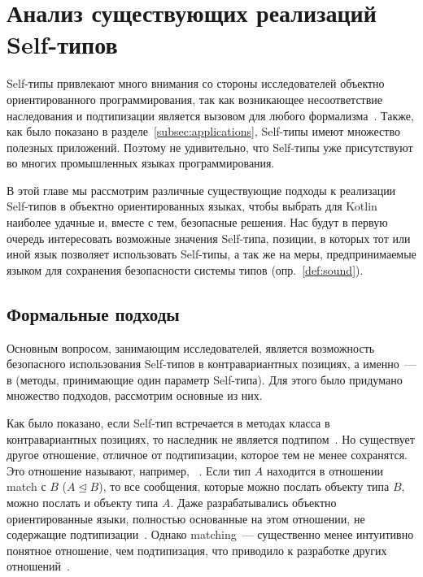 \section{Анализ существующих реализаций Self-типов} \label{sec:impls}

Self-типы привлекают много внимания со стороны исследователей объектно ориентированного программирования, так как возникающее несоответствие наследования и подтипизации является вызовом для любого формализма~\cite{cook1989inheritance}.
Также, как было показано в разделе~\ref{subsec:applications}, Self-типы имеют множество полезных приложений.
Поэтому не удивительно, что Self-типы уже присутствуют во многих промышленных языках программирования.

В этой главе мы рассмотрим различные существующие подходы к реализации Self-типов в объектно ориентированных языках, чтобы выбрать для Kotlin наиболее удачные и, вместе с тем, безопасные решения.
Нас будут в первую очередь интересовать возможные значения Self-типа, позиции, в которых тот или иной язык позволяет использовать Self-типы, а так же на меры, предпринимаемые языком для сохранения безопасности системы типов (опр.~\ref{def:sound}).


\subsection{Формальные подходы} \label{subsec:formals}

Основным вопросом, занимающим исследователей, является возможность безопасного использования Self-типов в контравариантных позициях, а именно~--- в  (методы, принимающие один параметр Self-типа).
Для этого было придумано множество подходов, рассмотрим основные из них.

Как было показано, если Self-тип встречается в методах класса в контравариантных позициях, то наследник не является подтипом~\cite{cook1989inheritance}.
Но существует другое отношение, отличное от подтипизации, которое тем не менее сохранятся.
Это отношение называют, например, ~\cite{bruce1993safe}.
Если тип $A$ находится в отношении match с $B$ ($A \trianglelefteq B$), то все сообщения, которые можно послать объекту типа $B$, можно послать и объекту типа $A$.
Даже разрабатывались объектно ориентированные языки, полностью основанные на этом отношении, не содержащие подтипизации~\cite{bruce1997subtyping}.
Однако matching~--- существенно менее интуитивно понятное отношение, чем подтипизация, что приводило к разработке других отношений~\cite{ryu2016thistype}.

